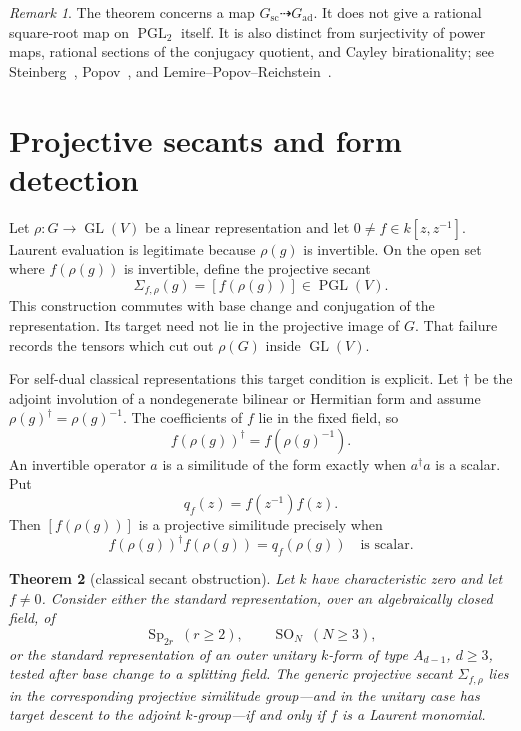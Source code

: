 \documentclass[11pt,reqno]{amsart}
\newtheorem{theorem}{Theorem}[section]
\theoremstyle{definition}
\theoremstyle{remark}
\newtheorem{remark}[theorem]{Remark}
\newcommand{\GL}{\operatorname{GL}}
\newcommand{\PGL}{\operatorname{PGL}}
\newcommand{\Sp}{\operatorname{Sp}}
\newcommand{\SO}{\operatorname{SO}}
\newcommand{\ssc}{\mathrm{sc}}
\newcommand{\aad}{\mathrm{ad}}
\begin{document}
\begin{remark}
The theorem concerns a map \(G_{\ssc}\dashrightarrow G_{\aad}\).  It does not
give a rational square-root map on \(\PGL_2\) itself.  It is also distinct from
surjectivity of power maps, rational sections of the conjugacy quotient, and
Cayley birationality; see Steinberg~\cite{SteinbergPower},
Popov~\cite{PopovCrossSections}, and Lemire--Popov--Reichstein~\cite{LPRCayley}.
\end{remark}

\section{Projective secants and form detection}

Let \(\rho:G\to\GL(V)\) be a linear representation and let
\(0\ne f\in k[z,z^{-1}]\).  Laurent evaluation is legitimate because
\(\rho(g)\) is invertible.  On the open set where \(f(\rho(g))\) is
invertible,
define the projective secant
\[
 \Sigma_{f,\rho}(g)=[f(\rho(g))]\in\PGL(V).
\tag{4.1}
\]
This construction commutes with base change and conjugation of the
representation.  Its target need not lie in the projective image of \(G\).
That failure records the tensors which cut out \(\rho(G)\) inside
\(\GL(V)\).

For self-dual classical representations this target condition is explicit.
Let \(\dagger\) be the adjoint involution of a nondegenerate bilinear or
Hermitian form and assume \(\rho(g)^\dagger=\rho(g)^{-1}\).  The coefficients
of \(f\) lie in the fixed field, so
\[
 f(\rho(g))^\dagger=f(\rho(g)^{-1}).
\]
An invertible operator \(a\) is a similitude of the form exactly when
\(a^\dagger a\) is a scalar.  Put
\[
 q_f(z)=f(z^{-1})f(z).
\tag{4.2}
\]
Then \([f(\rho(g))]\) is a projective similitude precisely when
\[
 f(\rho(g))^\dagger f(\rho(g))=q_f(\rho(g))
\quad\text{is scalar}.
\tag{4.3}
\]

\begin{theorem}[classical secant obstruction]\label{thm:classical-secant}
Let \(k\) have characteristic zero and let \(f\ne0\).  Consider either the
standard representation, over an algebraically closed field, of
\[
 \Sp_{2r}\ (r\ge2),\qquad
 \SO_N\ (N\ge3),
\]
or the standard representation of an outer unitary \(k\)-form of type
\(A_{d-1}\), \(d\ge3\), tested after base change to a splitting field.
The generic projective secant \(\Sigma_{f,\rho}\) lies in the corresponding
projective similitude group---and in the unitary case has target descent to
the adjoint \(k\)-group---if and only if \(f\) is a Laurent monomial.
\end{theorem}
\end{document}

